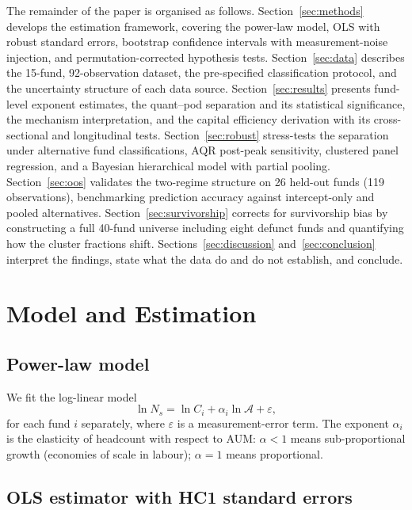 \documentclass[10pt,onecolumn]{article}
\newcommand{\Ns}{N_{s}}
\newcommand{\Ac}{\mathcal{A}}
\begin{document}
The remainder of the paper is organised as follows.
Section~\ref{sec:methods} develops the estimation framework, covering
the power-law model, OLS with robust standard errors, bootstrap
confidence intervals with measurement-noise injection, and
permutation-corrected hypothesis tests.
Section~\ref{sec:data} describes the 15-fund, 92-observation dataset,
the pre-specified classification protocol, and the uncertainty
structure of each data source.
Section~\ref{sec:results} presents fund-level exponent estimates, the
quant--pod separation and its statistical significance, the mechanism
interpretation, and the capital efficiency derivation with its
cross-sectional and longitudinal tests.
Section~\ref{sec:robust} stress-tests the separation under alternative
fund classifications, AQR post-peak sensitivity, clustered panel
regression, and a Bayesian hierarchical model with partial pooling.
Section~\ref{sec:oos} validates the two-regime structure on 26
held-out funds (119 observations), benchmarking prediction accuracy
against intercept-only and pooled alternatives.
Section~\ref{sec:survivorship} corrects for survivorship bias by
constructing a full 40-fund universe including eight defunct funds and
quantifying how the cluster fractions shift.
Sections~\ref{sec:discussion} and~\ref{sec:conclusion} interpret the
findings, state what the data do and do not establish, and conclude.


\section{\label{sec:methods}Model and Estimation}

\subsection{Power-law model}

We fit the log-linear model
\begin{equation}
  \label{eq:loglinear}
  \ln \Ns = \ln C_i + \alpha_i \ln \Ac + \varepsilon,
\end{equation}
for each fund $i$ separately, where $\varepsilon$ is a
measurement-error term.
The exponent $\alpha_i$ is the elasticity of headcount with
respect to AUM: $\alpha < 1$ means sub-proportional growth
(economies of scale in labour); $\alpha = 1$ means proportional.

\subsection{OLS estimator with HC1 standard errors}
\end{document}
